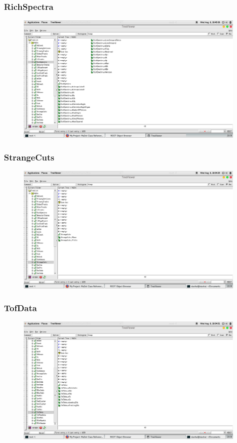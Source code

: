 \documentclass[10pt]{beamer}
\begin{document}
\begin{frame}
  \frametitle{RichSpectra}
  \begin{figure}[hbtp]
    \centering
    \includegraphics[width=\textwidth]{RichSpectra.png}
  \end{figure}
\end{frame}
\label{StrangeCuts}
\begin{frame}
  \frametitle{StrangeCuts}
  \begin{figure}[hbtp]
    \centering
    \includegraphics[width=\textwidth]{StrangeCuts.png}
  \end{figure}
\end{frame}
\label{TofData}
\begin{frame}
  \frametitle{TofData}
  \begin{figure}[hbtp]
    \centering
    \includegraphics[width=\textwidth]{TofData.png}
  \end{figure}
\end{frame}
\end{document}
